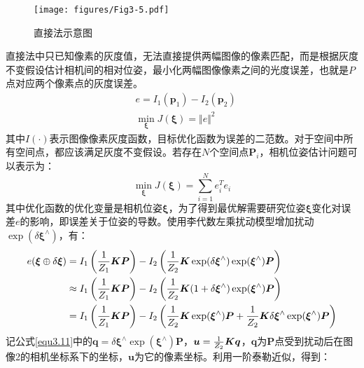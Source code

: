 \begin{figure}[h]
\centering
\texttt{[image: figures/Fig3-5.pdf]}
\caption{直接法示意图}
\label{fig3.5}
\end{figure}

直接法中只已知像素的灰度值，无法直接提供两幅图像的像素匹配，而是根据灰度不变假设估计相机间的相对位姿，最小化两幅图像像素之间的光度误差，也就是$P$点对应两个像素点的灰度误差。
\begin{equation}
\label{equ3.9}
\begin{aligned}
& e = I_1(\boldsymbol{p}_1) - I_2(\boldsymbol{p}_2) 
\\ 
& \min\limits_{\boldsymbol{\xi}} J(\boldsymbol{\xi}) = \Vert e \Vert ^2
\end{aligned}
\end{equation}
其中$I(\cdot)$表示图像像素灰度函数，目标优化函数为误差的二范数。对于空间中所有空间点，都应该满足灰度不变假设。若存在$N$个空间点$\boldsymbol{P}_i$，相机位姿估计问题可以表示为：
\begin{equation}
\label{equ3.10}
\min\limits_{\boldsymbol{\xi}} J(\boldsymbol{\xi}) = \sum\limits_{i=1}^N e_i^T e_i
\end{equation}
其中优化函数的优化变量是相机位姿$\boldsymbol{\xi}$，为了得到最优解需要研究位姿$\boldsymbol{\xi}$变化对误差$e$的影响，即误差关于位姿的导数。使用李代数左乘扰动模型增加扰动$\exp( \delta \boldsymbol{\xi}^{\wedge})$，有：
\begin{equation}
\label{equ3.11}
\begin{aligned}
e(\boldsymbol{\xi}\oplus \delta \boldsymbol{\xi}) & = I_1\left({1 \over Z_1} \boldsymbol{K} \boldsymbol{P} \right) - I_2\left({1 \over Z_2} \boldsymbol{K} \exp (\delta \boldsymbol{\xi}^{\wedge}) \exp (\boldsymbol{\xi}^{\wedge}) \boldsymbol{P} \right)
\\
& \approx I_1\left( {1 \over Z_1} \boldsymbol{K} \boldsymbol{P} \right) - I_2 \left( {1 \over Z_2} \boldsymbol{K} (1+\delta \boldsymbol{\xi}^{\wedge}) \exp (\boldsymbol{\xi}^{\wedge}) \boldsymbol{P} \right)
\\
& = I_1\left( {1 \over Z_1} \boldsymbol{K} \boldsymbol{P} \right) - I_2 \left({1 \over Z_2} \boldsymbol{K} \exp (\boldsymbol{\xi}^{\wedge}) \boldsymbol{P}+ {1 \over Z_2} \boldsymbol{K} \delta \boldsymbol{\xi}^{\wedge} \exp (\boldsymbol{\xi}^{\wedge}) \boldsymbol{P} \right)
\end{aligned}
\end{equation}
记公式\eqref{equ3.11}中的$\boldsymbol{q} = \delta \boldsymbol{\xi}^{\wedge} \exp (\boldsymbol{\xi}^{\wedge}) \boldsymbol{P} $，$\boldsymbol{u}={1 \over Z_2} \boldsymbol{K} \boldsymbol{q}$，$\boldsymbol{q}$为$\boldsymbol{P}$点受到扰动后在图像2的相机坐标系下的坐标，$\boldsymbol{u}$为它的像素坐标。利用一阶泰勒近似，得到：
